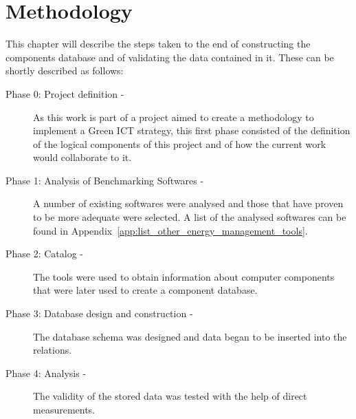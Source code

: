 

\chapter{Methodology} \label{chap3:methodology}

   This chapter will describe the steps taken to the end of constructing the components database and of validating the data contained in it.
These can be shortly described as follows:
    \begin{description}
        \item[Phase 0: Project definition -] As this work is part of a project aimed to create a methodology to implement a Green ICT strategy, this first phase consisted of the definition of the logical components of this project and of how the current work would collaborate to it.
        \item[Phase 1: Analysis of Benchmarking Softwares -] A number of existing softwares were analysed and those that have proven to be more adequate were selected. A list of the analysed softwares can be found in Appendix~\ref{app:list_other_energy_management_tools}.
        \item[Phase 2: Catalog -] The tools were used to obtain information about computer components that were later used to create a component database.
        \item[Phase 3: Database design and construction -] The database schema was designed and data began to be inserted into the relations.
        \item[Phase 4: Analysis -] The validity of the stored data was tested with the help of direct measurements.
    \end{description}


